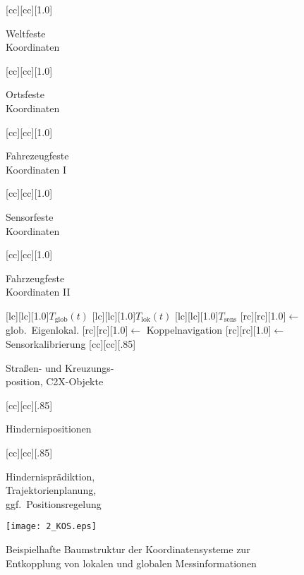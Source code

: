 \begin{figure}[h]
\newcommand{\smallsize}{.85}
	[cc][cc][1.0]{\parbox[c]{7cm}{\begin{center} Weltfeste \\ Koordinaten \end{center}}}
	[cc][cc][1.0]{\parbox[c]{7cm}{\begin{center} Ortsfeste \\ Koordinaten \end{center}}}
	[cc][cc][1.0]{\parbox[c]{7cm}{\begin{center} Fahrezeugfeste \\ Koordinaten I \end{center}}}
	[cc][cc][1.0]{\parbox[c]{7cm}{\begin{center} Sensorfeste \\ Koordinaten \end{center}}}
	[cc][cc][1.0]{\parbox[c]{7cm}{\begin{center} Fahrzeugfeste \\ Koordinaten II \end{center}}}
	[lc][lc][1.0]{$T_\text{glob}(t)$}
	[lc][lc][1.0]{$T_\text{lok}(t)$}
	[lc][lc][1.0]{$T_\text{sens}$}
	[rc][rc][1.0]{$\leftarrow$ glob.\ Eigenlokal.}
	[rc][rc][1.0]{$\leftarrow$ Koppelnavigation}
	[rc][rc][1.0]{$\leftarrow$ Sensorkalibrierung}
	[cc][cc][\smallsize]{\parbox[c]{7cm}{\begin{center} Straßen- und Kreuzungs- \\
																							position, C2X-Objekte \end{center}}}
  [cc][cc][\smallsize]{\parbox[c]{7cm}{\begin{center} Hindernispositionen \end{center}}}
	[cc][cc][\smallsize]{\parbox[c]{7cm}{\begin{center} Hindernisprädiktion, \\ Trajektorienplanung, \\ ggf.\ Positionsregelung \end{center}}}
\texttt{[image: 2\_KOS.eps]}
 \caption[Beispielhafte Baumstruktur der Koordinatensysteme]{Beispielhafte Baumstruktur der Koordinatensysteme zur Entkopplung von lokalen und globalen Messinformationen}
 \label{fig:KOS}
\end{figure} 

